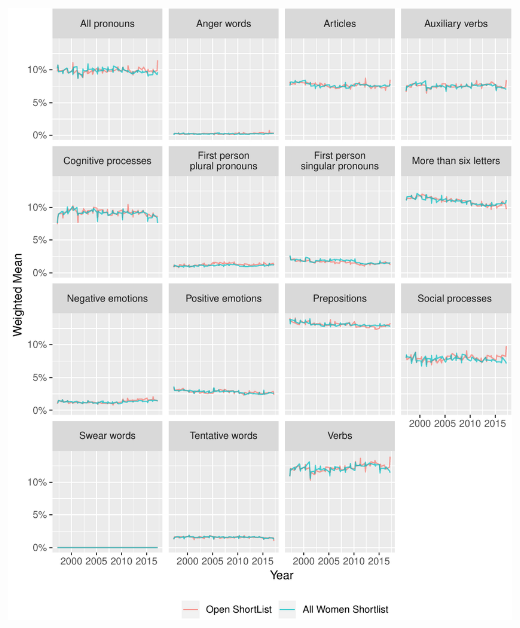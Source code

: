 \documentclass[]{article}
\let\origfigure\figure
\let\endorigfigure\endfigure
\renewenvironment{figure}[1][2] {
    \expandafter\origfigure\expandafter[H]
} {
    \endorigfigure
}
\theoremstyle{definition}
\theoremstyle{definition}
\theoremstyle{definition}
\theoremstyle{remark}
\begin{document}
\begin{figure}
\centering
\includegraphics{methodology_files/figure-latex/sl-key-date-1.pdf}
\caption{\label{fig:sl-key-date}Occurrence of selected LIWC terms, by date}
\end{figure}
\end{document}
